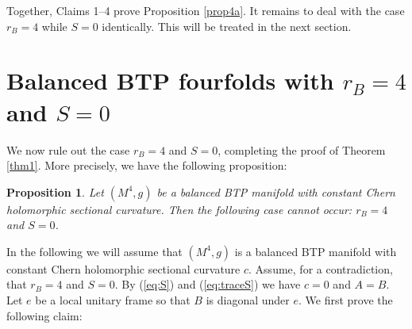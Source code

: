 \documentclass{amsart}
\newtheorem{proposition}{Proposition}
\begin{document}
Together, Claims 1--4 prove Proposition \ref{prop4a}. It remains to deal with the case $r_B=4$ while $S=0$ identically. This will be treated in the next section.



\vspace{0.3cm}

\section{Balanced BTP fourfolds with \texorpdfstring{$r_B=4$ and $S=0$}{rB = 4 and S = 0}}


We now rule out the case $r_B=4$ and $S=0$, completing the proof of Theorem \ref{thm1}. More precisely, we have the following proposition:

\begin{proposition} \label{prop4b}
Let $(M^4,g)$ be a balanced BTP manifold with constant Chern holomorphic sectional curvature. Then the following case cannot occur: $r_B=4$ and $S= 0$.
\end{proposition}

In the following we will assume that $(M^4,g)$ is a balanced BTP manifold with constant Chern holomorphic sectional curvature $c$. Assume, for a contradiction, that $r_B=4$ and $S=0$. By (\ref{eq:S}) and (\ref{eq:traceS}) we have $c=0$ and $A=B$. Let $e$ be a local unitary frame so that $B$ is diagonal under $e$. We first prove the following claim:

\vspace{0.4cm}
\end{document}
